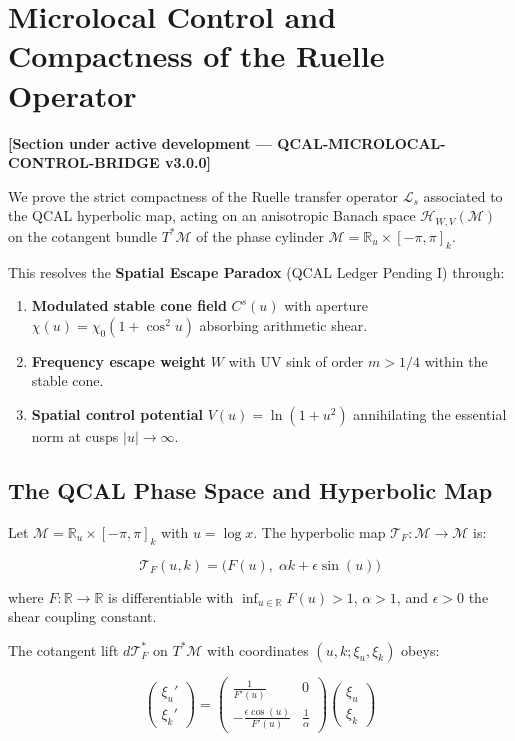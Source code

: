 \section{Microlocal Control and Compactness of the Ruelle Operator}
\label{sec:microlocal_control}

\textbf{[Section under active development — QCAL-MICROLOCAL-CONTROL-BRIDGE v3.0.0]}

We prove the strict compactness of the Ruelle transfer operator $\mathcal{L}_s$ associated to the QCAL hyperbolic map, acting on an anisotropic Banach space $\mathcal{H}_{W,V}(\mathcal{M})$ on the cotangent bundle $T^*\mathcal{M}$ of the phase cylinder $\mathcal{M} = \mathbb{R}_u \times [-\pi, \pi]_k$.

This resolves the \textbf{Spatial Escape Paradox} (QCAL Ledger Pending I) through:

\begin{enumerate}
    \item \textbf{Modulated stable cone field} $C^s(u)$ with aperture $\chi(u) = \chi_0(1 + \cos^2 u)$ absorbing arithmetic shear.
    \item \textbf{Frequency escape weight} $W$ with UV sink of order $m > 1/4$ within the stable cone.
    \item \textbf{Spatial control potential} $V(u) = \ln(1 + u^2)$ annihilating the essential norm at cusps $|u| \to \infty$.
\end{enumerate}

\subsection{The QCAL Phase Space and Hyperbolic Map}

Let $\mathcal{M} = \mathbb{R}_u \times [-\pi, \pi]_k$ with $u = \log x$. The hyperbolic map $\mathcal{T}_F: \mathcal{M} \to \mathcal{M}$ is:

\[
\mathcal{T}_F(u, k) = \bigl(F(u),\; \alpha k + \epsilon \sin(u) \bigr)
\]

where $F: \mathbb{R} \to \mathbb{R}$ is differentiable with $\inf_{u \in \mathbb{R}} F(u) > 1$, $\alpha > 1$, and $\epsilon > 0$ the shear coupling constant.

The cotangent lift $d\mathcal{T}_F^*$ on $T^*\mathcal{M}$ with coordinates $(u, k; \xi_u, \xi_k)$ obeys:

\[
\begin{pmatrix} \xi_u' \\ \xi_k' \end{pmatrix} =
\begin{pmatrix} \frac{1}{F'(u)} & 0 \\ -\frac{\epsilon \cos(u)}{F'(u)} & \frac{1}{\alpha} \end{pmatrix}
\begin{pmatrix} \xi_u \\ \xi_k \end{pmatrix}
\]

